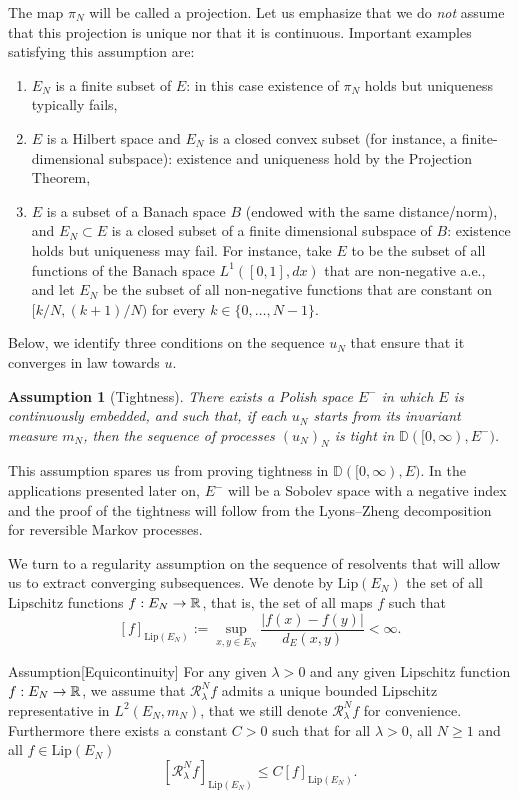 \documentclass[10pt]{amsart}
\theoremstyle{definition}\newtheorem{defi}[theo]{Definition}\newtheorem{rema}[theo]{Remark}\newtheorem{exam}[theo]{Example}\newtheorem{exem}[theo]{Example}\newtheorem{nota}[theo]{Notation}
\theoremstyle{plain}
\newtheorem{assu}[theo]{Assumption}}
\newcommand{\bbD}{\mathbb{D}}
\newcommand{\cR}{\mathcal{R}}
\newcommand{\R}{\mathbb{R}}
\newcommand*\Lip{\mathrm{Lip}}
\renewcommand*{\to}{\mathchoice{\longrightarrow}{\rightarrow}{\rightarrow}{\rightarrow}}
\begin{document}
The map $\pi_N$ will be called a projection. Let us emphasize that we do \emph{not} assume that this projection is unique nor that it is continuous. Important examples satisfying this assumption are:
\begin{enumerate}
\item\label{assuption-it1} $E_N$ is a finite subset of $E$: in this case existence of $\pi_N$ holds but uniqueness typically fails,
\item\label{assuption-it2} $E$ is a Hilbert space and $E_N$ is a closed convex subset (for instance, a finite-dimensional subspace): existence and uniqueness hold by the {Projection Theorem},
\item\label{assuption-it3} $E$ is a subset of a Banach space $B$ (endowed with the same distance/norm), and $E_N \subset E$ is a closed subset of a finite dimensional subspace of $B$: existence holds but uniqueness may fail. For instance, take $E$ to be the subset of all functions of the Banach space $L^1([0,1],dx)$ that are non-negative a.e., and let $E_N$ be the subset of all non-negative functions that are constant on $[k/N,(k+1)/N)$ for every $k\in\{0,\dots,N-1\}$.
\end{enumerate}


Below, we identify three conditions on the sequence $u_N$ that ensure that it converges in law towards $u$.

\begin{assu}[Tightness]\label{Ass:Tight}
There exists a Polish space $E^{-}$ in which $E$ is continuously embedded, and such that, if each $u_N$ starts from its invariant measure $m_N$, then the sequence of processes $(u_N)_N$ is tight in $\bbD([0,\infty),E^{-})$.
\end{assu}

This assumption spares us from proving tightness in $\bbD([0,\infty),E)$. In the applications presented later on, $E^-$ will be a Sobolev space with a negative index and the proof of the tightness will follow from the Lyons--Zheng decomposition~\cite{LyonsZheng} for reversible Markov processes.

We turn to a regularity assumption on the sequence of resolvents that will allow us to extract converging subsequences. We denote by $\Lip(E_N)$ the set of all Lipschitz functions $f:E_N\to\R$, that is, the set of all maps $f$ such that
\[
[f]_{\Lip(E_N)} := \sup_{x,y \in E_N} \frac{| f(x) - f(y) |}{d_E(x, y)}<\infty.
\]

\begin{enonce}{Assumption}[Equicontinuity]\label{Ass:Equi}
For any given $\lambda > 0$ and any given Lipschitz function $f:E_N\to\R$, we assume that $\cR_\lambda^N f$ admits a unique bounded Lipschitz representative in $L^2(E_N,m_N)$, that we still denote $\cR_\lambda^N f$ for convenience. Furthermore there exists a constant $C>0$ such that for all $\lambda > 0$, all $N\ge 1$ and all $f\in \Lip(E_N)$
\[
[\cR_\lambda^N f]_{\Lip(E_N)} \le C [f]_{\Lip(E_N)}.
\]
\end{enonce}
\end{document}
